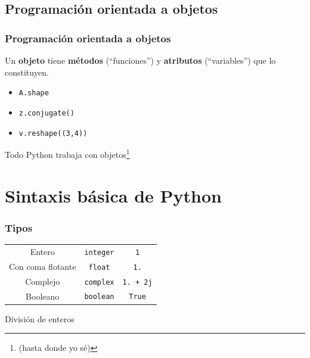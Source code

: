 \documentclass{beamer}
\begin{document}
\subsection{Programación orientada a objetos}

\begin{frame}\frametitle{Programación orientada a objetos}
	Un \textbf{objeto} tiene \textbf{métodos} (``funciones'') y \textbf{atributos} (``variables'') que lo constituyen.

	\begin{itemize}
		\item \texttt{A.shape}
		\item \texttt{z.conjugate()}
		\item \texttt{v.reshape((3,4))}
	\end{itemize}

	Todo Python trabaja con objetos\footnote{\tiny (hasta donde yo sé)}
\end{frame}


\section{Sintaxis básica de Python}

\begin{frame}\frametitle{Tipos}
	\centering
	\begin{tabular}{ccc}
		Entero 				& \texttt{integer} 			& \texttt{1} \\
		Con coma flotante	& \texttt{float} 			& \texttt{1.} \\
		Complejo 			& \texttt{complex} 			& \texttt{1. + 2j} \\
		Booleano 			& \texttt{boolean} 			& \texttt{True} \\
	\end{tabular}

	\begin{alertblock}{División de enteros}
		
	\end{alertblock}
\end{frame}
\end{document}
